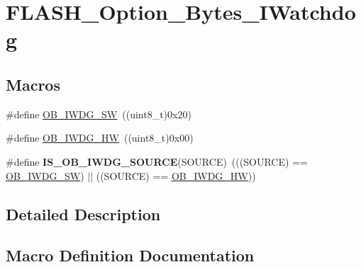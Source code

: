 \hypertarget{group___f_l_a_s_h___option___bytes___i_watchdog}{}\section{F\+L\+A\+S\+H\+\_\+\+Option\+\_\+\+Bytes\+\_\+\+I\+Watchdog}
\label{group___f_l_a_s_h___option___bytes___i_watchdog}
\subsection*{Macros}
\begin{DoxyCompactItemize}
\item 
\#define \hyperlink{group___f_l_a_s_h___option___bytes___i_watchdog_ga5a357e232c955444c3f2ccb9a937ffce}{O\+B\+\_\+\+I\+W\+D\+G\+\_\+\+S\+W}~((uint8\+\_\+t)0x20)
\item 
\#define \hyperlink{group___f_l_a_s_h___option___bytes___i_watchdog_gadfcbfa963d79c339ec8e2d5a7734e47a}{O\+B\+\_\+\+I\+W\+D\+G\+\_\+\+H\+W}~((uint8\+\_\+t)0x00)
\item 
\hypertarget{group___f_l_a_s_h___option___bytes___i_watchdog_gaf2871652c08e76499d9449be6556f12c}{}\#define {\bfseries I\+S\+\_\+\+O\+B\+\_\+\+I\+W\+D\+G\+\_\+\+S\+O\+U\+R\+C\+E}(S\+O\+U\+R\+C\+E)~(((S\+O\+U\+R\+C\+E) == \hyperlink{group___f_l_a_s_h___option___bytes___i_watchdog_ga5a357e232c955444c3f2ccb9a937ffce}{O\+B\+\_\+\+I\+W\+D\+G\+\_\+\+S\+W}) $\vert$$\vert$ ((S\+O\+U\+R\+C\+E) == \hyperlink{group___f_l_a_s_h___option___bytes___i_watchdog_gadfcbfa963d79c339ec8e2d5a7734e47a}{O\+B\+\_\+\+I\+W\+D\+G\+\_\+\+H\+W}))\label{group___f_l_a_s_h___option___bytes___i_watchdog_gaf2871652c08e76499d9449be6556f12c}

\end{DoxyCompactItemize}


\subsection{Detailed Description}


\subsection{Macro Definition Documentation}
\hypertarget{group___f_l_a_s_h___option___bytes___i_watchdog_gadfcbfa963d79c339ec8e2d5a7734e47a}{}
